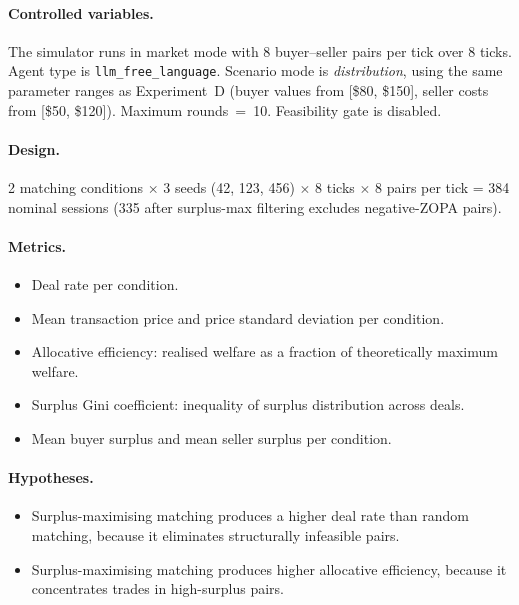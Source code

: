 \paragraph{Controlled variables.}
The simulator runs in market mode with 8 buyer--seller pairs per tick over 8 ticks.  Agent type is \texttt{llm\_free\_language}.  Scenario mode is \emph{distribution}, using the same parameter ranges as Experiment~D (buyer values from [\$80, \$150], seller costs from [\$50, \$120]).  Maximum rounds~=~10.  Feasibility gate is disabled.

\paragraph{Design.}
2 matching conditions $\times$ 3 seeds (42, 123, 456) $\times$ 8 ticks $\times$ 8 pairs per tick = 384 nominal sessions (335 after surplus-max filtering excludes negative-ZOPA pairs).

\paragraph{Metrics.}
\begin{itemize}
    \item Deal rate per condition.
    \item Mean transaction price and price standard deviation per condition.
    \item Allocative efficiency: realised welfare as a fraction of theoretically maximum welfare.
    \item Surplus Gini coefficient: inequality of surplus distribution across deals.
    \item Mean buyer surplus and mean seller surplus per condition.
\end{itemize}

\paragraph{Hypotheses.}
\begin{itemize}
    \item[\textbf{H-H1.}] Surplus-maximising matching produces a higher deal rate than random matching, because it eliminates structurally infeasible pairs.
    \item[\textbf{H-H2.}] Surplus-maximising matching produces higher allocative efficiency, because it concentrates trades in high-surplus pairs.
\end{itemize}


